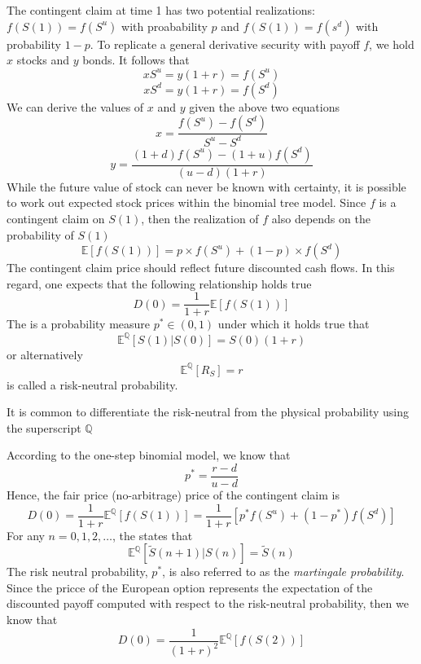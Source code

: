 \documentclass{article}
\begin{document}
The contingent claim at time 1 has two potential realizations: $f(S(1)) = f(S^u)$ with proabability $p$ and $f(S(1)) = f(s^d)$ with probability $1-p$. To replicate a general derivative security with payoff $f$, we hold $x$ stocks and $y$ bonds. It follows that $$xS^u = y(1+r) = f(S^u)$$ $$xS^d = y(1+r) = f(S^d)$$ We can derive the values of $x$ and $y$ given the above two equations $$x = \frac{f(S^u) - f(S^d)}{S^u - S^d}$$ $$y = \frac{(1+d)f(S^u) - (1+u)f(S^d)}{(u-d)(1+r)}$$ While the future value of stock can never be known with certainty, it is possible to work out expected stock prices within the binomial tree model. Since $f$ is a contingent claim on $S(1)$, then the realization of $f$ also depends on the probability of $S(1)$ $$\mathbb{E}[f(S(1))] = p \times f(S^u) + (1-p) \times f(S^d)$$ The contingent claim price should reflect future discounted cash flows. In this regard, one expects that the following relationship holds true $$D(0) = \frac{1}{1+r} \mathbb{E}[f(S(1))]$$ The  is a probability measure $p^{*} \in (0,1)$ under which it holds true that $$\mathbb{E}^{\mathbb{Q}}[S(1) \vert S(0)] = S(0)(1+r)$$ or alternatively $$\mathbb{E}^{\mathbb{Q}}[R_S] = r$$ is called a risk-neutral probability. 

\begin{remark}
  It is common to differentiate the risk-neutral from the physical probability using the superscript $\mathbb{Q}$ 
\end{remark}

According to the one-step binomial model, we know that $$p^{*} = \frac{r-d}{u-d}$$ Hence, the fair price (no-arbitrage) price of the contingent claim is $$D(0) = \frac{1}{1+r} \mathbb{E}^{\mathbb{Q}}[f(S(1))] = \frac{1}{1+r}[p^* f(S^u) + (1-p^*)f(S^d)]$$ For any $n=0,1,2, \dots$, the  states that $$\mathbb{E}^{\mathbb{Q}}[\tilde{S}(n+1) \vert S(n)] = \tilde{S}(n)$$ The risk neutral probability, $p^*$, is also referred to as the \emph{martingale probability}. Since the pricce of the European option represents the expectation of the discounted payoff computed with respect to the risk-neutral probability, then we know that $$D(0) = \frac{1}{(1+r)^2} \mathbb{E}^{\mathbb{Q}} [f(S(2))]$$ 
\end{document}
